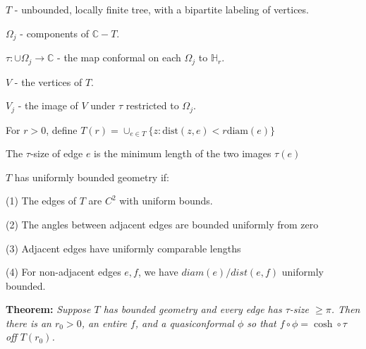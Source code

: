 \documentclass{beamer}
\begin{document}
\begin{frame}

{\tiny $T$ - unbounded, locally finite tree, with a bipartite labeling of vertices.

$\Omega_j$ - components of $\mathbb{C}-T$.

$\tau: \cup \Omega_j \rightarrow \mathbb{C}$ - the map conformal on each $\Omega_j$ to $\mathbb{H}_r$.

$V$ - the vertices of $T$. 

$V_j$ - the image of $V$ under $\tau$ restricted to $\Omega_j$.

For $r > 0$, define $T(r) = \cup_{e\in T} \{z : \textrm{dist}(z,e) < r\textrm{diam}(e) \}$

The $\tau$-size of edge $e$ is the minimum length of the two images $\tau(e)$

\vspace{2.5mm}

$T$ has uniformly bounded geometry if: 

\hspace{5mm} (1) The edges of $T$ are $C^2$ with uniform bounds. 

\hspace{5mm} (2) The angles between adjacent edges are bounded uniformly from zero

\hspace{5mm} (3) Adjacent edges have uniformly comparable lengths

\hspace{5mm} (4) For non-adjacent edges $e, f$, we have $diam(e)/dist(e,f)$ uniformly bounded. 

 }
\vspace{5mm}
{\bf Theorem:} {\it  Suppose $T$ has bounded geometry and every edge has $\tau$-size $\geq \pi$.  Then there is an $r_0 > 0$, an entire $f$, and a quasiconformal $\phi$ so that $f \circ \phi = \cosh \circ \tau$ off $T(r_0)$. }  

\end{frame}
\end{document}
